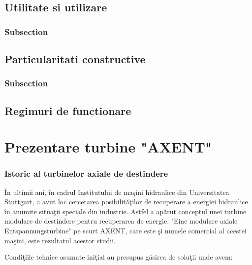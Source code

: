 \section{Utilitate si utilizare}

\subsection{Subsection}

\section{Particularitati constructive}

\subsection{Subsection}

\section{Regimuri de functionare}

\chapter{Prezentare turbine "AXENT"}\label{chapter:prezentare}


\subsection{Istoric al turbinelor axiale de destindere}

\^{I}n ultimii ani, \^{i}n cadrul Institutului de ma\c{s}ini hidraulice din Universitatea Stuttgart, a avut loc cercetarea posibilit\u{a}\c{t}ilor de recuperare a energiei hidraulice \^{i}n anumite situa\c{t}ii speciale din industrie. Astfel a ap\u{a}rut conceptul unei turbine modulare de destindere pentru recuperarea de energie. "Eine modulare axiale Entspannungsturbine" pe scurt AXENT, care este \c{s}i numele comercial al acestei ma\c{s}ini, este rezultatul acestor studii.

Condi\c{t}iile tehnice asumate ini\c{t}ial au presupus g\u{a}sirea de solu\c{t}ii unde avem:

